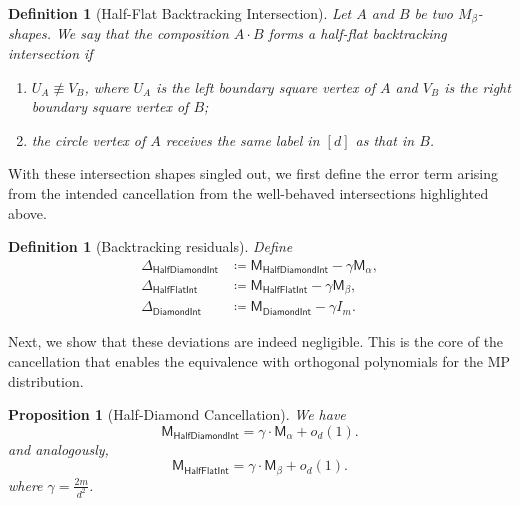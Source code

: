 \documentclass[12pt]{article}
\def \al {\alpha}
\newtheorem{proposition}[theorem]{Proposition}
\newtheorem{definition}[theorem]{Definition}
\newcommand{\gam}{\gamma}
\newcommand{\cm}{\mathsf{M} }
\begin{document}
\begin{definition}[Half-Flat Backtracking Intersection]
	Let \(A\) and \(B\) be two \(M_\beta \)-shapes. We say that the composition
\(A\cdot B\) forms a \emph{half-flat backtracking intersection} if
\begin{enumerate}
    \item \(U_A \not\equiv V_B\), where \(U_A\) is the left boundary square
    vertex of \(A\) and \(V_B\) is the right boundary square vertex of \(B\);
    \item the circle vertex of \(A\) receives the same label in $[d]$ as that in $B$.
\end{enumerate}
\end{definition}


With these intersection shapes singled out, we first define the error term arising from the intended cancellation from the well-behaved intersections highlighted above. 

\begin{definition}[Backtracking residuals]
\label{def:backtracking-residuals}
Define
\begin{align*}
    \Delta_{\mathsf{HalfDiamondInt}}
    &\coloneqq
    \cm_{\mathsf{HalfDiamondInt}}
    -
    \gamma\cm_\alpha, \\
    \Delta_{\mathsf{HalfFlatInt}}
    &\coloneqq
    \cm_{\mathsf{HalfFlatInt}}
    -
    \gamma\cm_\beta, \\
    \Delta_{\mathsf{DiamondInt}}
    &\coloneqq
    \cm_{\mathsf{DiamondInt}}
    -
    \gamma I_m.
\end{align*}
%
\end{definition}
Next, we show that these deviations are indeed negligible. This is the core of the cancellation that enables the equivalence with orthogonal polynomials for the MP distribution.


\begin{proposition}[Half-Diamond Cancellation] \label{prop:half-diamond-cancellation}
We have
\[
    \cm_{\mathsf{HalfDiamondInt}}
        =
    \gamma \cdot \cm_\al  + o_d(1).
\]
and analogously,
\[
    \cm_{\mathsf{HalfFlatInt}}
        =
    \gamma \cdot \cm_\beta   + o_d(1).
\]
where $\gam = \frac{2m}{d^2}$.
\end{proposition}
\end{document}
